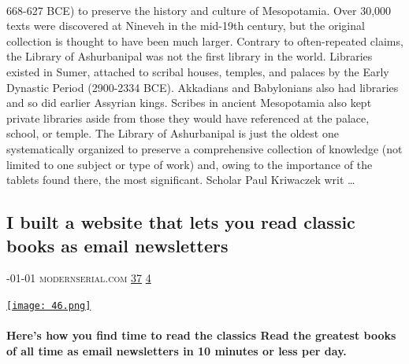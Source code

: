 \documentclass[10pt,a4paper]{article}
\begin{document}
\begin{multicols}{2}
\paragraph{}
 668-627 BCE) to preserve the history and culture of Mesopotamia. Over 30,000 texts were discovered at Nineveh in the mid-19th century, but the original collection is thought to have been much larger.
Contrary to often-repeated claims, the Library of Ashurbanipal was not the first library in the world. Libraries existed in Sumer, attached to scribal houses, temples, and palaces by the Early Dynastic Period (2900-2334 BCE). Akkadians and Babylonians also had libraries and so did earlier Assyrian kings. Scribes in ancient Mesopotamia also kept private libraries aside from those they would have referenced at the palace, school, or temple. The Library of Ashurbanipal is just the oldest one systematically organized to preserve a comprehensive collection of knowledge (not limited to one subject or type of work) and, owing to the importance of the tablets found there, the most significant. Scholar Paul Kriwaczek writ
\dots\par
\noindent\begin{minipage}{\linewidth}
\medskip
\subsection{I built a website that lets you read classic books as email newsletters}
\textsc{\footnotesize
{\scriptsize\faCalendar}-01-01 
{\scriptsize\faGlobe}\space 
modernserial.com 
{\scriptsize\faThumbsOUp}\space 
\href{http://news.ycombinator.com/item?id=37296202\&utm\_term=comment}{37} 
{\scriptsize\faComments}\space 
\href{http://news.ycombinator.com/item?id=37296202\&utm\_term=comment}{4} 
}
\par\medskip\noindent
\href{https://modernserial.com/?utm\_source=hackernewsletter\&utm\_medium=email\&utm\_term=books}{
    \texttt{[image: 46.png]}
}
\end{minipage}
\paragraph{}
\textbf{Here's how you find time to read the classics
Read the greatest books of all time as email newsletters in 10 minutes or less per day.}
\paragraph{}


\end{multicols}
\end{document}
